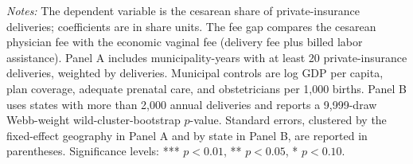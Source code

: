 \begin{table}[H]
\begin{minipage}{\linewidth}\footnotesize
\textit{Notes:} The dependent variable is the cesarean share of private-insurance deliveries; coefficients are in share units. The fee gap compares the cesarean physician fee with the economic vaginal fee (delivery fee plus billed labor assistance). Panel A includes municipality-years with at least 20 private-insurance deliveries, weighted by deliveries. Municipal controls are log GDP per capita, plan coverage, adequate prenatal care, and obstetricians per 1,000 births. Panel B uses states with more than 2,000 annual deliveries and reports a 9,999-draw Webb-weight wild-cluster-bootstrap $p$-value. Standard errors, clustered by the fixed-effect geography in Panel A and by state in Panel B, are reported in parentheses.
\newline
\footnotesize Significance levels: *** $p<0.01$, ** $p<0.05$, * $p<0.10$.
\end{minipage}
\end{table}
